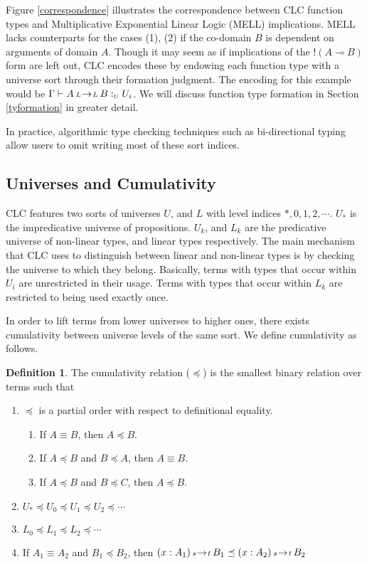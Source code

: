 \documentclass{article}
\theoremstyle{definition}
\newtheorem{definition}{Definition}[section]
\newcommand{\utype}{:_{\scriptscriptstyle U}}
\newcommand{\arw}[2]
{\hspace*{0.2em}{\scriptstyle #1}\hspace*{-0.2em}
\rightarrow
\hspace*{-0.2em}{\scriptstyle #2}\hspace*{0.2em}}
\begin{document}
  Figure \ref{correspondence} illustrates the correspondence between CLC function types and Multiplicative Exponential Linear Logic (MELL) implications. MELL lacks counterparts for the cases (1), (2) if the co-domain $B$ is dependent on arguments of domain $A$. Though it may seem as if implications of the $!(A \multimap B)$ form are left out, CLC encodes these by endowing each function type with a universe sort through their formation judgment. The encoding for this example would be $\Gamma \vdash A \arw{L}{L} B \utype U_i $. We will discuss function type formation in Section \ref{tyformation} in greater detail.

  In practice, algorithmic type checking techniques such as bi-directional typing allow users to omit writing most of these sort indices.

  \subsection{Universes and Cumulativity}
  CLC features two sorts of universes $U$, and $L$ with level indices $*, 0, 1, 2, \cdots$. $U_*$ is the impredicative universe of propositions. $U_k$, and $L_k$ are the predicative universe of non-linear types, and linear types respectively. The main mechanism that CLC uses to distinguish between linear and non-linear types is by checking the universe to which they belong. Basically, terms with types that occur within $U_i$ are unrestricted in their usage. Terms with types that occur within $L_k$ are restricted to being used exactly once.

  In order to lift terms from lower universes to higher ones, there exists cumulativity between universe levels of the same sort. We define cumulativity as follows.

  \begin{definition}
    The cumulativity relation ($\preceq$) is the smallest binary relation over terms such that
    \begin{enumerate}
      \item $\preceq$ is a partial order with respect to definitional equality.
        \begin{enumerate}
          \item If $A \equiv B$, then $A \preceq B$.
          \item If $A \preceq B$ and $B \preceq A$, then $A \equiv B$.
          \item If $A \preceq B$ and $B \preceq C$, then $A \preceq B$.
        \end{enumerate}
      \item $U_* \preceq U_0 \preceq U_1 \preceq U_2 \preceq \cdots$
      \item $L_0 \preceq L_1 \preceq L_2 \preceq \cdots$
      \item If $A_1 \equiv A_2$ and $B_1 \preceq B_2$, then
        $(x : A_1) \arw{s}{t} B_1 \preceq (x : A_2) \arw{s}{t} B_2$
    \end{enumerate}
  \end{definition}
\end{document}
